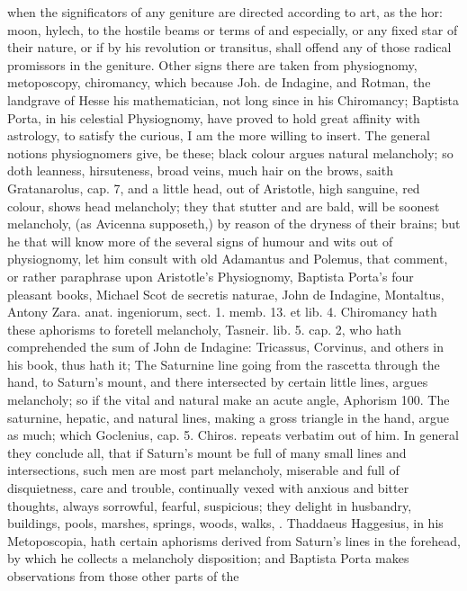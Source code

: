 {when the significators of any geniture are directed according to art,
as the hor: moon, hylech, \etc{} to the hostile beams or terms of \saturn{} and \mars{}
especially, or any fixed star of their nature, or if \saturn{} by his
revolution or transitus, shall offend any of those radical promissors
in the geniture.
Other signs there are taken from physiognomy, metoposcopy, chiromancy,
which because Joh. de Indagine, and Rotman, the landgrave of Hesse his
mathematician, not long since in his Chiromancy; Baptista Porta, in his
celestial Physiognomy, have proved to hold great affinity with
astrology, to satisfy the curious, I am the more willing to insert.
The general notions physiognomers give, be these; black colour
argues natural melancholy; so doth leanness, hirsuteness, broad veins,
much hair on the brows, saith Gratanarolus, cap. 7, and a little
head, out of Aristotle, high sanguine, red colour, shows head
melancholy; they that stutter and are bald, will be soonest melancholy,
(as Avicenna supposeth,) by reason of the dryness of their brains; but
he that will know more of the several signs of humour and wits out of
physiognomy, let him consult with old Adamantus and Polemus, that
comment, or rather paraphrase upon Aristotle's Physiognomy, Baptista
Porta's four pleasant books, Michael Scot de secretis naturae, John de
Indagine, Montaltus, Antony Zara. anat. ingeniorum, sect. 1. memb. 13.
et lib. 4.
Chiromancy hath these aphorisms to foretell melancholy, Tasneir. lib.
5. cap. 2, who hath comprehended the sum of John de Indagine:
Tricassus, Corvinus, and others in his book, thus hath it; The
Saturnine line going from the rascetta through the hand, to Saturn's
mount, and there intersected by certain little lines, argues
melancholy; so if the vital and natural make an acute angle, Aphorism
100. The saturnine, hepatic, and natural lines, making a gross triangle
in the hand, argue as much; which Goclenius, cap. 5. Chiros. repeats
verbatim out of him. In general they conclude all, that if Saturn's
mount be full of many small lines and intersections, such men are
most part melancholy, miserable and full of disquietness, care and
trouble, continually vexed with anxious and bitter thoughts, always
sorrowful, fearful, suspicious; they delight in husbandry, buildings,
pools, marshes, springs, woods, walks, \etc{}. Thaddaeus Haggesius, in his
Metoposcopia, hath certain aphorisms derived from Saturn's lines in the
forehead, by which he collects a melancholy disposition; and
Baptista Porta makes observations from those other parts of the
}
